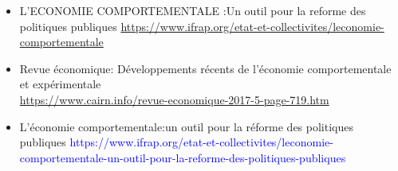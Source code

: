 \documentclass[serif]{beamer}
\begin{document}
\begin{frame}[plain,t]
\vspace*{1cm}
\begin{tcolorbox}[enhanced,attach boxed title to top center={yshift=-3mm,yshifttext=-1mm},
  colback=yellow!5!white,colframe=blue!75!black,colbacktitle=gray!80!black,
  title=WEBOGRAPHIE,fonttitle=\bfseries,
  boxed title style={size=small,colframe=red!50!black} ]

\hspace*{-1cm}
\begin{itemize}
\item L’ECONOMIE COMPORTEMENTALE :Un outil pour la reforme des politiques publiques
\textcolor{blue}{\url{https://www.ifrap.org/etat-et-collectivites/leconomie-comportementale}}

\item Revue économique: Développements récents de l'économie comportementale et expérimentale\\
\textcolor{blue}{\url{https://www.cairn.info/revue-economique-2017-5-page-719.htm}}

\item L'économie comportementale:un outil pour la réforme des politiques publiques
\textcolor{blue}{https://www.ifrap.org/etat-et-collectivites/leconomie-comportementale-un-outil-pour-la-reforme-des-politiques-publiques}

\end{itemize}
\end{tcolorbox}
\end{frame}

\begin{frame}[plain,t]
\vspace{2cm}
\begin{LARGE}
 
\end{LARGE}
\end{frame}
\end{document}
